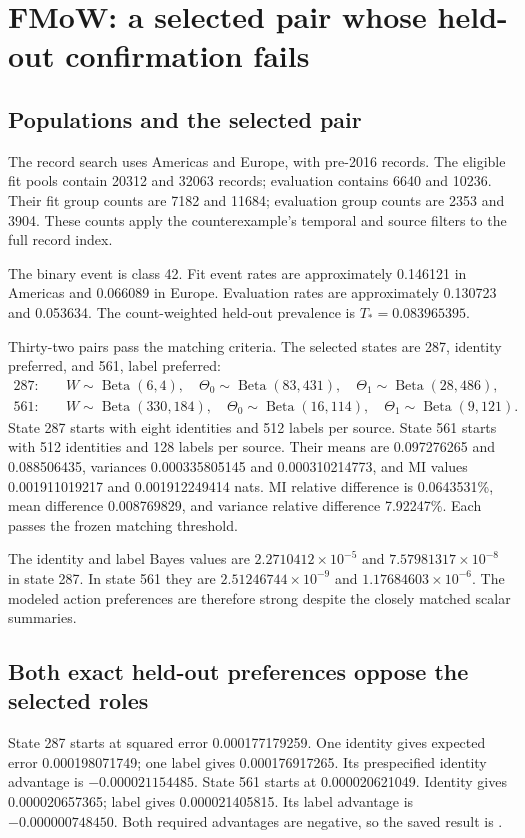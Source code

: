 \documentclass[11pt,a4paper]{report}
\newcommand{\Beta}{\operatorname{Beta}}
\newcommand{\code}[1]{\texttt{\detokenize{#1}}}
\begin{document}
\chapter{FMoW: a selected pair whose held-out confirmation fails}
\section{Populations and the selected pair}
The record search uses Americas and Europe, with pre-2016 records. The eligible fit pools contain 20312 and 32063 records; evaluation contains 6640 and 10236. Their fit group counts are 7182 and 11684; evaluation group counts are 2353 and 3904. These counts apply the counterexample's temporal and source filters to the full record index.

The binary event is class 42. Fit event rates are approximately 0.146121 in Americas and 0.066089 in Europe. Evaluation rates are approximately 0.130723 and 0.053634. The count-weighted held-out prevalence is $T_*=0.083965395$.

Thirty-two pairs pass the matching criteria. The selected states are 287, identity preferred, and 561, label preferred:
\begin{align*}
287:\quad&W\sim\Beta(6,4),\quad\Theta_0\sim\Beta(83,431),\quad\Theta_1\sim\Beta(28,486),\\
561:\quad&W\sim\Beta(330,184),\quad\Theta_0\sim\Beta(16,114),\quad\Theta_1\sim\Beta(9,121).
\end{align*}
State 287 starts with eight identities and 512 labels per source. State 561 starts with 512 identities and 128 labels per source. Their means are 0.097276265 and 0.088506435, variances 0.000335805145 and 0.000310214773, and MI values 0.001911019217 and 0.001912249414 nats. MI relative difference is 0.0643531\%, mean difference 0.008769829, and variance relative difference 7.92247\%. Each passes the frozen matching threshold.

The identity and label Bayes values are $2.2710412\times10^{-5}$ and $7.57981317\times10^{-8}$ in state 287. In state 561 they are $2.51246744\times10^{-9}$ and $1.17684603\times10^{-6}$. The modeled action preferences are therefore strong despite the closely matched scalar summaries.

\section{Both exact held-out preferences oppose the selected roles}
State 287 starts at squared error 0.000177179259. One identity gives expected error 0.000198071749; one label gives 0.000176917265. Its prespecified identity advantage is $-0.000021154485$. State 561 starts at 0.000020621049. Identity gives 0.000020657365; label gives 0.000021405815. Its label advantage is $-0.000000748450$. Both required advantages are negative, so the saved result is \code{confirmed: false}.
\end{document}
